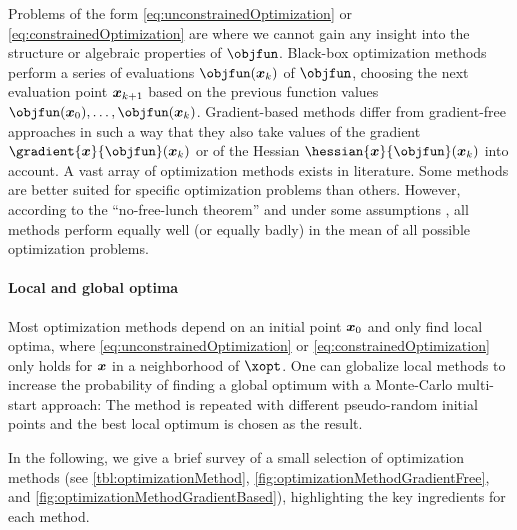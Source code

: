Problems of the form \eqref{eq:unconstrainedOptimization} or
\eqref{eq:constrainedOptimization} are 
where we cannot gain any insight into the structure or algebraic
properties of $\objfun$.
Black-box optimization methods perform a series of evaluations
$\objfun(\*x_k)$ of $\objfun$,
choosing the next evaluation point ${\boldsymbol{x}}_{k+1}$
based on the previous function values $\objfun(\*x_0), \dotsc, \objfun(\*x_k)$.
Gradient-based methods differ from gradient-free approaches
in such a way that they also take values of the gradient
$\gradient{\*x}{\objfun}(\*x_k)$ or of the Hessian
$\hessian{\*x}{\objfun}(\*x_k)$ into account.
A vast array of optimization methods exists in literature.
Some methods are better suited for specific optimization problems
than others.
However, according to the ``no-free-lunch theorem''
and under some assumptions \cite{Wolpert97No},
all methods perform equally well (or equally badly) in the mean of all possible
optimization problems.

\paragraph{Local and global optima}

Most optimization methods depend on an initial point ${\boldsymbol{x}}_0$ and
only find local optima,
where \eqref{eq:unconstrainedOptimization} or
\eqref{eq:constrainedOptimization} only holds for ${\boldsymbol{x}}$
in a neighborhood of $\xopt$.
One can globalize local methods to increase the probability
of finding a global optimum with a Monte-Carlo multi-start approach:
The method is repeated with different pseudo-random initial points
and the best local optimum is chosen as the result.

In the following,
we give a brief survey of a small selection of optimization methods
(see
\cref{tbl:optimizationMethod},
\cref{fig:optimizationMethodGradientFree}, and
\cref{fig:optimizationMethodGradientBased}),
highlighting the key ingredients for each method.

